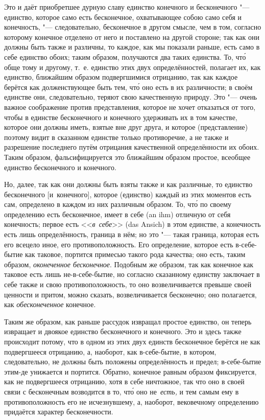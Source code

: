 Это и даёт приобретшее дурную славу единство конечного и бесконечного
"--- единство, которое само есть бесконечное, охватывающее собою само себя и
конечность, "--- следовательно, бесконечное в другом смысле, чем в том,
согласно которому конечное отделено от него и поставлено на другой стороне;
так как они должны быть также и различны, то каждое, как мы показали
раньше, есть само в себе единство обоих; таким образом, получаются два
таких единства. То, чт\'{о} обще тому и другому, т.~е. единство этих двух
определённостей, полагает их, как единство, ближайшим образом подвергшимися
отрицанию, так как каждое берётся как долженствующее быть тем, чт\'{о} оно есть
в их различности; в своём единстве они, следовательно, теряют свою
качественную природу. Это "--- очень важное соображение против представления,
которое не хочет отказаться от того, чтобы в единстве бесконечного и
конечного удерживать их в том качестве, которое они должны иметь, взятые
вне друг друга, и которое (представление) поэтому видит в сказанном
единстве только противоречие, а не также и разрешение последнего путём
отрицания качественной определённости их обоих. Таким образом,
фальсифицируется это ближайшим образом простое, всеобщее единство
бесконечного и конечного.

Но, далее, так как они должны быть взяты также и как различные, то единство
бесконечного [и~конечного], которое (единство) каждый из этих моментов есть
сам, определено в каждом из них различным образом. То, чт\'{о} по своему
определению есть бесконечное, имеет в себе (an ihm) отличную от себя
конечность; первое есть <<{\em в~себе}>> (das Ansich) в
этом единстве, а конечность есть лишь определённость, граница в нём; но это
"--- такая граница, которая есть его всецело иное, его
противоположность. Его определение, которое есть в-себе-бытие как таковое,
портится примесью такого рода качества; оно есть, таким образом,
{\em оконеченное бесконечное}. Подобным же образом, так
как конечное как таковое есть лишь не-в-себе-бытие, но согласно сказанному
единству заключает в себе также и свою противоположность, то оно
возвеличивается превыше своей ценности и притом, можно сказать,
возвеличивается бесконечно; оно полагается, как
{\em обесконеченное} конечное.

Таким же образом, как раньше рассудок извращал простое единство, он
теперь извращает и двоякое единство бесконечного и конечного.
Это и здесь также происходит потому, что в одном из этих двух единств
бесконечное берётся не как подвергшееся отрицанию, а, наоборот, как
в-себе-бытие, в котором, следовательно, не должны быть положены
определённость и предел; в-себе-бытие этим-де унижается и портится.
Обратно, конечное равным образом фиксируется, как не подвергшееся
отрицанию, хотя в себе ничтожное, так что оно в своей связи с бесконечным
возводится в то, чт\'{о} оно не~{\em есть,} и тем самым ему
в противоположность его не исчезнувшему, а, наоборот, вековечному
определению придаётся характер бесконечности.


